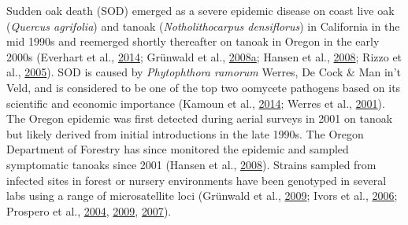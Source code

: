 \documentclass[double,12pt]{beavtex}
\begin{document}
  Sudden oak death (SOD) emerged as a severe epidemic disease on coast
  live oak (\emph{Quercus agrifolia}) and tanoak (\emph{Notholithocarpus
  densiflorus}) in California in the mid 1990s and reemerged shortly
  thereafter on tanoak in Oregon in the early 2000s (Everhart et al.,
  \protect\hyperlink{ref-everhart2014phytophthora}{2014}; Grünwald et al.,
  \protect\hyperlink{ref-grunwald2008phytophthora}{2008}\protect\hyperlink{ref-grunwald2008phytophthora}{a};
  Hansen et al., \protect\hyperlink{ref-hansen2008epidemiology}{2008};
  Rizzo et al., \protect\hyperlink{ref-rizzo2005phytophthora}{2005}). SOD
  is caused by \emph{Phytophthora ramorum} Werres, De Cock \& Man in't
  Veld, and is considered to be one of the top two oomycete pathogens
  based on its scientific and economic importance (Kamoun et al.,
  \protect\hyperlink{ref-kamoun2014top}{2014}; Werres et al.,
  \protect\hyperlink{ref-werres2001phytophthora}{2001}). The Oregon
  epidemic was first detected during aerial surveys in 2001 on tanoak but
  likely derived from initial introductions in the late 1990s. The Oregon
  Department of Forestry has since monitored the epidemic and sampled
  symptomatic tanoaks since 2001 (Hansen et al.,
  \protect\hyperlink{ref-hansen2008epidemiology}{2008}). Strains sampled
  from infected sites in forest or nursery environments have been
  genotyped in several labs using a range of microsatellite loci (Grünwald
  et al., \protect\hyperlink{ref-grunwald2009standardizing}{2009}; Ivors
  et al., \protect\hyperlink{ref-ivors2006microsatellite}{2006}; Prospero
  et al., \protect\hyperlink{ref-prospero2004isolation}{2004},
  \protect\hyperlink{ref-prospero2009migration}{2009},
  \protect\hyperlink{ref-prospero2007population}{2007}).
  
\end{document}

